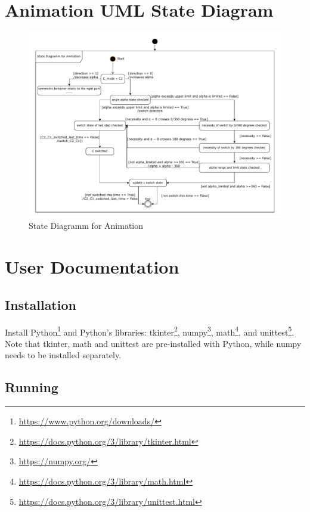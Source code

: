 \documentclass{article}
\begin{document}
\appendix

\section{Animation UML State Diagram} \label{ap:animation}

\begin{figure}[h]
	\centering
	\includegraphics[width=\textwidth]{./figures/animation_state_diagramm_1.pdf}
	\caption{State Diagramm for Animation}
	\label{fig:state_diagramm_of_animation_alpha}
\end{figure}

\section{User Documentation} \label{ch:user_docs}

\subsection{Installation}

Install Python\footnote{\url{https://www.python.org/downloads/}} and Python's libraries: tkinter\footnote{\url{https://docs.python.org/3/library/tkinter.html}}, numpy\footnote{\url{https://numpy.org/}}, math\footnote{\url{https://docs.python.org/3/library/math.html}}, and unittest\footnote{\url{https://docs.python.org/3/library/unittest.html}}. Note that tkinter, math and unittest are pre-installed with Python, while numpy needs to be installed separately.

\subsection{Running}
\end{document}
